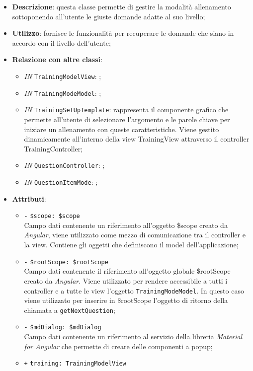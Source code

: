\begin{itemize}
	\item \textbf{Descrizione}: questa classe permette di gestire la modalità allenamento sottoponendo all'utente le giuste domande adatte al suo livello;
	\item \textbf{Utilizzo}: fornisce le funzionalità per recuperare le domande che siano in accordo con il livello dell'utente;
	\item \textbf{Relazione con altre classi}:
	\begin{itemize}
		\item \textit{IN} \texttt{TrainingModelView}: ;
		\item \textit{IN} \texttt{TrainingModeModel}: ;
		\item \textit{IN} \texttt{TrainingSetUpTemplate}: rappresenta il componente grafico che permette all'utente di selezionare l'argomento e le parole chiave per iniziare un allenamento con queste caratteristiche. Viene gestito dinamicamente all'interno della view TrainingView attraverso il controller TrainingController;
		\item \textit{IN} \texttt{QuestionController}: ;
		\item \textit{IN} \texttt{QuestionItemMode}: ;
	\end{itemize}
	\item \textbf{Attributi}:
	\begin{itemize}
		\item \texttt{-} \texttt{\$scope: \$scope} \\
		Campo dati contenente un riferimento all’oggetto \$scope creato da \textit{Angular}, viene utilizzato come mezzo di comunicazione tra il controller e la view. Contiene gli oggetti che definiscono il model dell’applicazione;
		\item \texttt{-} \texttt{\$rootScope: \$rootScope} \\
		Campo dati contenente il riferimento all'oggetto globale \$rootScope creato da \textit{Angular}. Viene utilizzato per rendere accessibile a tutti i controller e a tutte le view l'oggetto \texttt{TrainingModeModel}. In questo caso viene utilizzato per inserire in \$rootScope l'oggetto di ritorno della chiamata a \texttt{getNextQuestion};
		\item \texttt{-} \texttt{\$mdDialog: \$mdDialog} \\
		Campo dati contenente un riferimento al servizio della libreria \textit{Material for Angular} che permette di creare delle componenti a popup;
		\item \texttt{+} \texttt{training: TrainingModelView} \\

\end{itemize}
\end{itemize}
